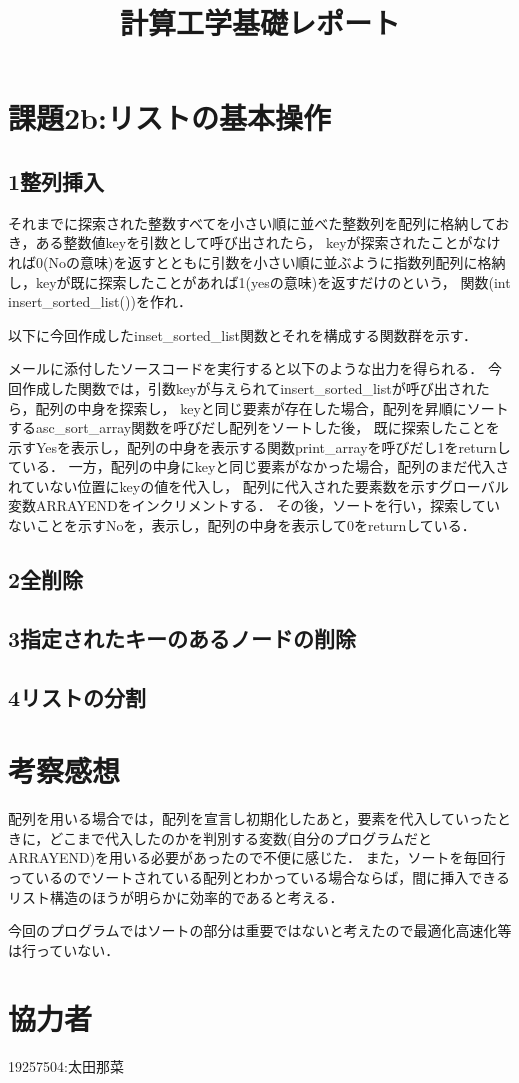 \documentclass[titlepage]{jarticle}
\title{計算工学基礎レポート}
\author{}
\begin{document}
\section*{課題2b:リストの基本操作}
\subsection*{1整列挿入}

それまでに探索された整数すべてを小さい順に並べた整数列を配列に格納しておき，ある整数値keyを引数として呼び出されたら，
keyが探索されたことがなければ0(Noの意味)を返すとともに引数を小さい順に並ぶように指数列配列に格納し，keyが既に探索したことがあれば1(yesの意味)を返すだけのという，
関数(int insert\_sorted\_list())を作れ． 

以下に今回作成したinset\_sorted\_list関数とそれを構成する関数群を示す．

メールに添付したソースコードを実行すると以下のような出力を得られる．
今回作成した関数では，引数keyが与えられてinsert\_sorted\_listが呼び出されたら，配列の中身を探索し，
keyと同じ要素が存在した場合，配列を昇順にソートするasc\_sort\_array関数を呼びだし配列をソートした後，
既に探索したことを示すYesを表示し，配列の中身を表示する関数print\_arrayを呼びだし1をreturnしている．
一方，配列の中身にkeyと同じ要素がなかった場合，配列のまだ代入されていない位置にkeyの値を代入し，
配列に代入された要素数を示すグローバル変数ARRAYENDをインクリメントする．
その後，ソートを行い，探索していないことを示すNoを，表示し，配列の中身を表示して0をreturnしている．
\subsection*{2全削除}
\subsection*{3指定されたキーのあるノードの削除}
\subsection*{4リストの分割}
\section*{考察感想}
配列を用いる場合では，配列を宣言し初期化したあと，要素を代入していったときに，どこまで代入したのかを判別する変数(自分のプログラムだとARRAYEND)を用いる必要があったので不便に感じた．
また，ソートを毎回行っているのでソートされている配列とわかっている場合ならば，間に挿入できるリスト構造のほうが明らかに効率的であると考える．

今回のプログラムではソートの部分は重要ではないと考えたので最適化高速化等は行っていない．

\section*{協力者}
19257504:太田那菜
\end{document}

